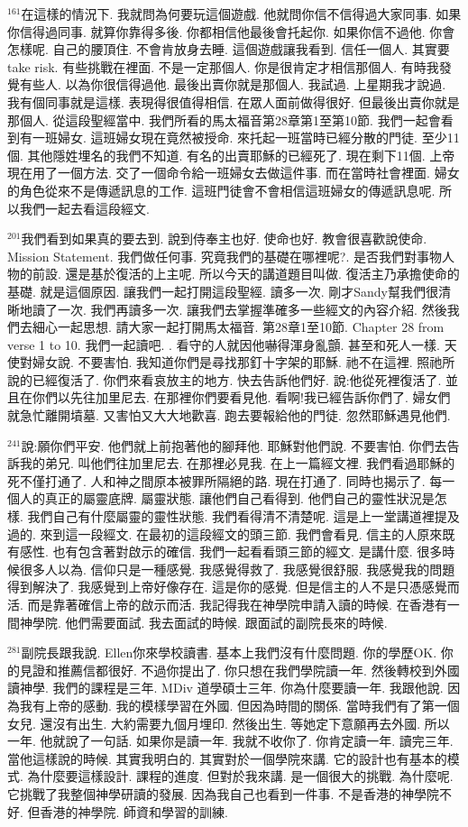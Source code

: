 \documentclass{book}
\begin{document}
$^{161}$在這樣的情況下.
我就問為何要玩這個遊戲.
他就問你信不信得過大家同事.
如果你信得過同事.
就算你靠得多後.
你都相信他最後會托起你.
如果你信不過他.
你會怎樣呢.
自己的腰頂住.
不會肯放身去睡.
這個遊戲讓我看到.
信任一個人.
其實要take risk.
有些挑戰在裡面.
不是一定那個人.
你是很肯定才相信那個人.
有時我發覺有些人.
以為你很信得過他.
最後出賣你就是那個人.
我試過.
上星期我才說過.
我有個同事就是這樣.
表現得很值得相信.
在眾人面前做得很好.
但最後出賣你就是那個人.
從這段聖經當中.
我們所看的馬太福音第28章第1至第10節.
我們一起會看到有一班婦女.
這班婦女現在竟然被授命.
來托起一班當時已經分散的門徒.
至少11個.
其他隱姓埋名的我們不知道.
有名的出賣耶穌的已經死了.
現在剩下11個.
上帝現在用了一個方法.
交了一個命令給一班婦女去做這件事.
而在當時社會裡面.
婦女的角色從來不是傳遞訊息的工作.
這班門徒會不會相信這班婦女的傳遞訊息呢.
所以我們一起去看這段經文.

$^{201}$我們看到如果真的要去到.
說到侍奉主也好.
使命也好.
教會很喜歡說使命.
Mission Statement.
我們做任何事.
究竟我們的基礎在哪裡呢?.
是否我們對事物人物的前設.
還是基於復活的上主呢.
所以今天的講道題目叫做.
復活主乃承擔使命的基礎.
就是這個原因.
讓我們一起打開這段聖經.
讀多一次.
剛才Sandy幫我們很清晰地讀了一次.
我們再讀多一次.
讓我們去掌握準確多一些經文的內容介紹.
然後我們去細心一起思想.
請大家一起打開馬太福音.
第28章1至10節.
Chapter 28 from verse 1 to 10.
我們一起讀吧.
.
看守的人就因他嚇得渾身亂顫.
甚至和死人一樣.
天使對婦女說.
不要害怕.
我知道你們是尋找那釘十字架的耶穌.
祂不在這裡.
照祂所說的已經復活了.
你們來看哀放主的地方.
快去告訴他們好.
說:他從死裡復活了.
並且在你們以先往加里尼去.
在那裡你們要看見他.
看啊!我已經告訴你們了.
婦女們就急忙離開墳墓.
又害怕又大大地歡喜.
跑去要報給他的門徒.
忽然耶穌遇見他們.

$^{241}$說:願你們平安.
他們就上前抱著他的腳拜他.
耶穌對他們說.
不要害怕.
你們去告訴我的弟兄.
叫他們往加里尼去.
在那裡必見我.
在上一篇經文裡.
我們看過耶穌的死不僅打通了.
人和神之間原本被罪所隔絕的路.
現在打通了.
同時也揭示了.
每一個人的真正的屬靈底牌.
屬靈狀態.
讓他們自己看得到.
他們自己的靈性狀況是怎樣.
我們自己有什麼屬靈的靈性狀態.
我們看得清不清楚呢.
這是上一堂講道裡提及過的.
來到這一段經文.
在最初的這段經文的頭三節.
我們會看見.
信主的人原來既有感性.
也有包含著對啟示的確信.
我們一起看看頭三節的經文.
是講什麼.
很多時候很多人以為.
信仰只是一種感覺.
我感覺得救了.
我感覺很舒服.
我感覺我的問題得到解決了.
我感覺到上帝好像存在.
這是你的感覺.
但是信主的人不是只憑感覺而活.
而是靠著確信上帝的啟示而活.
我記得我在神學院申請入讀的時候.
在香港有一間神學院.
他們需要面試.
我去面試的時候.
跟面試的副院長來的時候.

$^{281}$副院長跟我說.
Ellen你來學校讀書.
基本上我們沒有什麼問題.
你的學歷OK.
你的見證和推薦信都很好.
不過你提出了.
你只想在我們學院讀一年.
然後轉校到外國讀神學.
我們的課程是三年.
MDiv 道學碩士三年.
你為什麼要讀一年.
我跟他說.
因為我有上帝的感動.
我的模樣學習在外國.
但因為時間的關係.
當時我們有了第一個女兒.
還沒有出生.
大約需要九個月埋印.
然後出生.
等她定下意願再去外國.
所以一年.
他就說了一句話.
如果你是讀一年.
我就不收你了.
你肯定讀一年.
讀完三年.
當他這樣說的時候.
其實我明白的.
其實對於一個學院來講.
它的設計也有基本的模式.
為什麼要這樣設計.
課程的進度.
但對於我來講.
是一個很大的挑戰.
為什麼呢.
它挑戰了我整個神學研讀的發展.
因為我自己也看到一件事.
不是香港的神學院不好.
但香港的神學院.
師資和學習的訓練.
\end{document}
